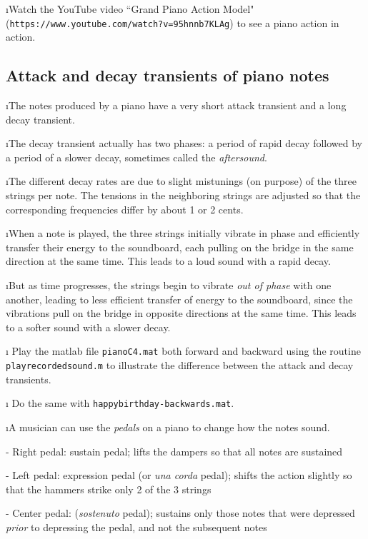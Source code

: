 \i \demo Watch the YouTube video ``Grand Piano Action Model"\\
({\tt https://www.youtube.com/watch?v=95hnnb7KLAg}) to see
a piano action in action.

\ei
\subsection{Attack and decay transients of piano notes} 
\bi

\i The notes produced by a piano have a very short attack 
transient and a long decay transient.

\i The decay transient actually has two phases:
a period of rapid decay followed by a period of a 
slower decay, sometimes called the {\em aftersound}.

\i The different decay rates are due to slight mistunings 
(on purpose) of the three strings per note.
The tensions in the neighboring strings are adjusted so that
the corresponding frequencies differ by about 1 or 2 cents.

\i When a note is played, the three strings initially vibrate
in phase and efficiently transfer their energy to the soundboard,
each pulling on the bridge in the same direction at the same time.
This leads to a loud sound with a rapid decay.

\i But as time progresses, the strings begin to vibrate 
{\em out of phase} with one another, leading to less efficient 
transfer of energy to the soundboard, since the vibrations
pull on the bridge in opposite directions at the same time.
This leads to a softer sound with a slower decay.

\i \demo
Play the matlab file {\tt pianoC4.mat}
both forward and backward using the routine 
{\tt playrecordedsound.m} to illustrate the 
difference between the attack and decay transients.

\i \demo
Do the same with {\tt happybirthday-backwards.mat}.

\i A musician can use the {\em pedals} on a piano to 
change how the notes sound.

- Right pedal: sustain pedal; lifts the dampers so that
all notes are sustained 

- Left pedal: expression pedal (or {\em una corda} pedal); 
shifts the action slightly so that the hammers strike only 
2 of the 3 strings

- Center pedal: ({\em sostenuto} pedal); 
sustains only those notes that were depressed {\em prior} 
to depressing the pedal, and not the subsequent notes

